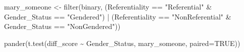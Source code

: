 \documentclass[
]{article}
\newenvironment{Shaded}{\begin{snugshade}}{\end{snugshade}}
\newcommand{\AttributeTok}[1]{\textcolor[rgb]{0.77,0.63,0.00}{#1}}
\newcommand{\ConstantTok}[1]{\textcolor[rgb]{0.00,0.00,0.00}{#1}}
\newcommand{\FunctionTok}[1]{\textcolor[rgb]{0.00,0.00,0.00}{#1}}
\newcommand{\NormalTok}[1]{#1}
\newcommand{\OtherTok}[1]{\textcolor[rgb]{0.56,0.35,0.01}{#1}}
\newcommand{\SpecialCharTok}[1]{\textcolor[rgb]{0.00,0.00,0.00}{#1}}
\newcommand{\StringTok}[1]{\textcolor[rgb]{0.31,0.60,0.02}{#1}}
\begin{document}
\begin{Shaded}
\begin{Highlighting}[]
\NormalTok{mary\_someone }\OtherTok{\textless{}{-}} \FunctionTok{filter}\NormalTok{(binary, (Referentiality }\SpecialCharTok{==} \StringTok{"Referential"} \SpecialCharTok{\&}\NormalTok{ Gender\_Status }\SpecialCharTok{==} \StringTok{"Gendered"}\NormalTok{) }\SpecialCharTok{|}\NormalTok{ (Referentiality }\SpecialCharTok{==} \StringTok{"NonReferential"} \SpecialCharTok{\&}\NormalTok{ Gender\_Status }\SpecialCharTok{==} \StringTok{"NonGendered"}\NormalTok{))}

\FunctionTok{pander}\NormalTok{(}\FunctionTok{t.test}\NormalTok{(diff\_score }\SpecialCharTok{\textasciitilde{}}\NormalTok{ Gender\_Status, mary\_someone, }\AttributeTok{paired=}\ConstantTok{TRUE}\NormalTok{))}
\end{Highlighting}
\end{Shaded}
\end{document}
